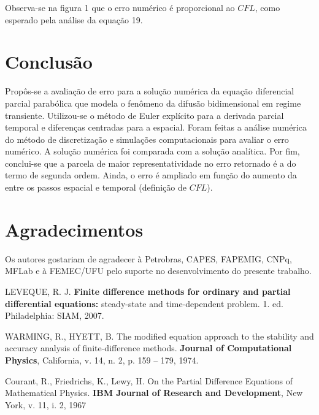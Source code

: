 \documentclass[10pt,twoside,a4paper]{article}
\begin{document}
	
	\vspace*{-4mm}


	Observa-se na figura 1 que o erro numérico é proporcional ao $CFL$, como esperado pela análise da equação 19.
	
	\section{Conclusão} %
	Propôs-se a avaliação de erro para a solução numérica da equação diferencial parcial parabólica que modela o fenômeno da difusão bidimensional em regime transiente. Utilizou-se o método de Euler explícito para a derivada parcial temporal e diferenças centradas para a espacial. Foram feitas a análise numérica do método de discretização e simulações computacionais para avaliar o erro numérico. A solução numérica foi comparada com a solução analítica. Por fim, conclui-se que a parcela de maior representatividade no erro retornado é a do termo de segunda ordem. Ainda, o erro é ampliado em função do aumento da  entre os passos espacial e temporal (definição de $CFL$).
	
	
	\section{Agradecimentos} %
	
	Os autores gostariam de agradecer à Petrobras, CAPES, FAPEMIG, CNPq, MFLab e à FEMEC/UFU pelo suporte no desenvolvimento do presente trabalho. 
	
	
	\begin{thebibliography}{9} %
		
		LEVEQUE, R. J. \textbf{Finite difference methods for ordinary and partial differential equations:} steady-state and time-dependent problem. 1. ed. Philadelphia: SIAM, 2007.
		
		WARMING, R., HYETT, B. The modified equation approach to the stability and accuracy analysis of finite-difference methods.	\textbf{Journal of Computational Physics}, California, v. 14, n. 2, p. 159 – 179, 1974.
	
			
		Courant, R., Friedrichs, K., Lewy, H. On the Partial Difference Equations
		of Mathematical Physics.   \textbf{IBM Journal of Research and Development}, New York, v. 11, i. 2, 1967 
				
	\end{thebibliography}
	
\end{document}
